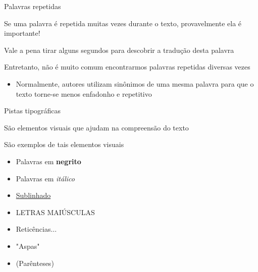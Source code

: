 \documentclass[compress,mathserif]{beamer}
\begin{document}

\begin{frame}{Palavras repetidas}

Se uma palavra é repetida muitas vezes durante o texto, provavelmente ela é importante!

\vspace{0.5cm}

Vale a pena tirar alguns segundos para descobrir a tradução desta palavra

\vspace{0.5cm}

Entretanto, não é muito comum encontrarmos palavras repetidas diversas vezes
\begin{itemize}
    \item Normalmente, autores utilizam sinônimos de uma mesma palavra para que o texto torne-se menos enfadonho e repetitivo
\end{itemize}

\end{frame}


\begin{frame}{Pistas tipográficas}

São elementos visuais que ajudam na compreensão do texto

\vspace{0.5cm}

São exemplos de tais elementos visuais
\begin{itemize}
    \item Palavras em \textbf{negrito}
    \item Palavras em \textit{itálico}
    \item \underline{Sublinhado}
    \item LETRAS MAIÚSCULAS
    \item Reticências$\ldots$
    \item "Aspas"
    \item (Parênteses)
\end{itemize}
\end{frame}

\end{document}
